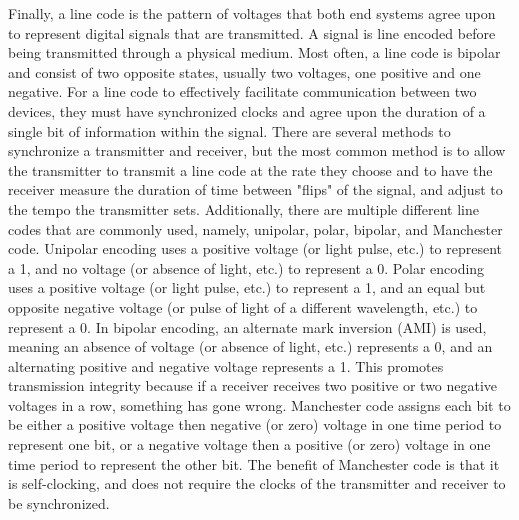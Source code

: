 \documentclass[11pt]{article}
\begin{document}
Finally, a line code is the pattern of voltages that both end systems agree upon to represent digital signals that are transmitted. A signal is line encoded before being transmitted through a physical medium. Most often, a line code is bipolar and consist of two opposite states, usually two voltages, one positive and one negative. For a line code to effectively facilitate communication between two devices, they must have synchronized clocks and agree upon the duration of a single bit of information within the signal. There are several methods to synchronize a transmitter and receiver, but the most common method is to allow the transmitter to transmit a line code at the rate they choose and to have the receiver measure the duration of time between "flips" of the signal, and adjust to the tempo the transmitter sets. Additionally, there are multiple different line codes that are commonly used, namely,  unipolar, polar, bipolar, and Manchester code. Unipolar encoding uses a positive voltage (or light pulse, etc.) to represent a 1, and no voltage (or absence of light, etc.) to represent a 0. Polar encoding uses a positive voltage (or light pulse, etc.) to represent a 1, and an equal but opposite negative voltage (or pulse of light of a different wavelength, etc.) to represent a 0. In bipolar encoding, an alternate mark inversion (AMI) is used, meaning an absence of voltage (or absence of light, etc.) represents a 0, and an alternating positive and negative voltage represents a 1. This promotes transmission integrity because if a receiver receives two positive or two negative voltages in a row, something has gone wrong. Manchester code assigns each bit to be either a positive voltage then negative (or zero) voltage in one time period to represent one bit, or a negative voltage then a positive (or zero) voltage in one time period to represent the other bit. The benefit of Manchester code is that it is self-clocking, and does not require the clocks of the transmitter and receiver to be synchronized.
\end{document}
